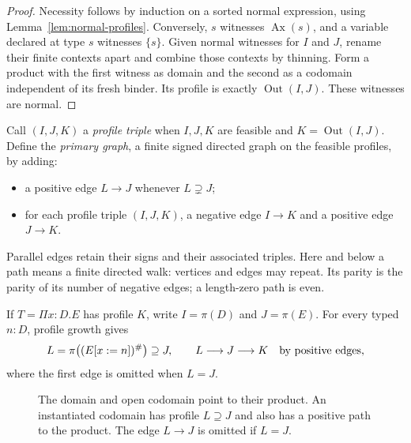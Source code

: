 \begin{proof}
Necessity follows by induction on a sorted normal expression, using
Lemma~\ref{lem:normal-profiles}. Conversely, $s$ witnesses
$\operatorname{Ax}(s)$, and a variable declared at type $s$ witnesses
$\{s\}$. Given normal witnesses for $I$ and $J$, rename their finite
contexts apart and combine those contexts by thinning. Form a product
with the first witness as domain and the second as a codomain
independent of its fresh binder. Its profile is exactly
$\operatorname{Out}(I,J)$. These witnesses are normal.
\end{proof}

Call $(I,J,K)$ a \emph{profile triple} when $I,J,K$ are feasible and
$K=\operatorname{Out}(I,J)$. Define the \emph{primary graph}, a finite signed directed graph on
the feasible profiles, by adding:
\begin{itemize}
\item a positive edge $L\to J$ whenever $L\supsetneq J$;
\item for each profile triple $(I,J,K)$, a negative edge $I\to K$
      and a positive edge $J\to K$.
\end{itemize}
Parallel edges retain their signs and their associated triples. Here and
below a path means a finite directed walk: vertices and edges may repeat.
Its parity is the parity of its number of negative edges; a
length-zero path is even.

If $T=\Pi x:D.E$ has profile $K$, write $I=\pi(D)$ and
$J=\pi(E)$. For every typed $n:D$, profile growth gives
\begin{equation}
 L=\pi\bigl((E[x:=n])^\#\bigr)\supseteq J,
 \qquad L\longrightarrow J\longrightarrow K
 \quad\hbox{by positive edges},
\label{eq:codomain-ascent}
\end{equation}
where the first edge is omitted when $L=J$.

\begin{figure}[ht]
\centering
{}
\caption{The domain and open codomain point to their product. An
instantiated codomain has profile $L\supseteq J$ and also has a
positive path to the product. The edge $L\to J$ is omitted if $L=J$.}
\label{fig:profile-dependencies}
\end{figure}

